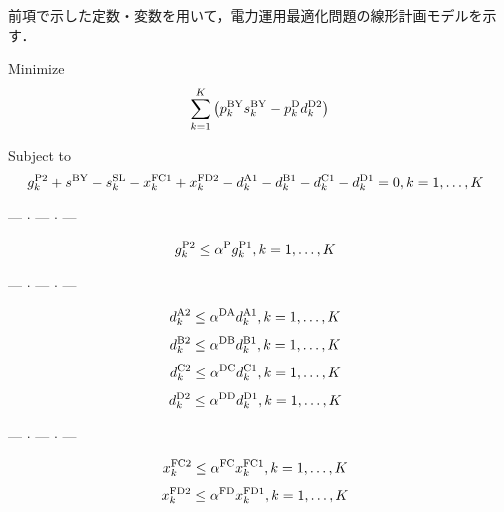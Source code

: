 \documentclass{jarticle}
\begin{document}
前項で示した定数・変数を用いて，電力運用最適化問題の線形計画モデルを示す．
%

\noindent
{\rm Minimize}
\begin{equation}
 \sum_{k=1}^{K} \left( p^{\rm BY}_{k}s^{\rm BY}_{k} - p^{\rm D}_{k}d^{\rm D2}_{k} \right)
 \label{eq:minimize}
\end{equation}

\noindent
{\rm Subject to}
%
\begin{equation}
 g^{\rm P2}_{k} + s^{\rm BY} - s^{\rm SL}_{k}
 - x^{\rm FC1}_{k} + x^{\rm FD2}_{k} 
 - d^{\rm A1}_{k} - d^{\rm B1}_{k} - d^{\rm C1}_{k} - d^{\rm D1}_{k} = 0,
 \hfill
 k=1,\ldots,K
~~
\end{equation}
%
\begin{center} --- $ \cdot $ --- $ \cdot $ --- \end{center}
%
\begin{equation}
 g^{\rm P2}_{k} \le \alpha^{\rm P} g^{\rm P1}_{k} ,
 \hfill
 k=1,\ldots,K
 ~~
 \label{eq:gP1gP2}
\end{equation}
%
\begin{center} --- $ \cdot $ --- $ \cdot $ --- \end{center}
%
\begin{equation}
 d^{\rm A2}_{k} \le \alpha^{\rm DA} d^{\rm A1}_{k} ,
 \hfill
 k=1,\ldots,K
~~
 \label{eq:dA1A2}
\end{equation}
%
\begin{equation}
 d^{\rm B2}_{k} \le \alpha^{\rm DB} d^{\rm B1}_{k},
 \hfill
 k=1,\ldots,K
~~
 \label{eq:dB1B2}
\end{equation}
%
\begin{equation}
 d^{\rm C2}_{k} \le \alpha^{\rm DC} d^{\rm C1}_{k},
 \hfill
 k=1,\ldots,K
~~
 \label{eq:dC1C2}
\end{equation}
%
\begin{equation}
 d^{\rm D2}_{k} \le \alpha^{\rm DD} d^{\rm D1}_{k},
 \hfill
 k=1,\ldots,K
~~
 \label{eq:dD1D2}
\end{equation}
%
\begin{center} --- $ \cdot $ --- $ \cdot $ --- \end{center}
%
\begin{equation}
 x^{\rm FC2}_{k} \le \alpha^{\rm FC}x^{\rm FC1}_{k},
 \hfill
 k=1,\ldots,K
~~
 \label{eq:xFC1FC2}
\end{equation}
%
\begin{equation}
 x^{\rm FD2}_{k} \le \alpha^{\rm FD} x^{\rm FD1}_{k} ,
 \hfill
 k=1,\ldots,K
~~
 \label{eq:FD1FD2}
\end{equation}
\end{document}
